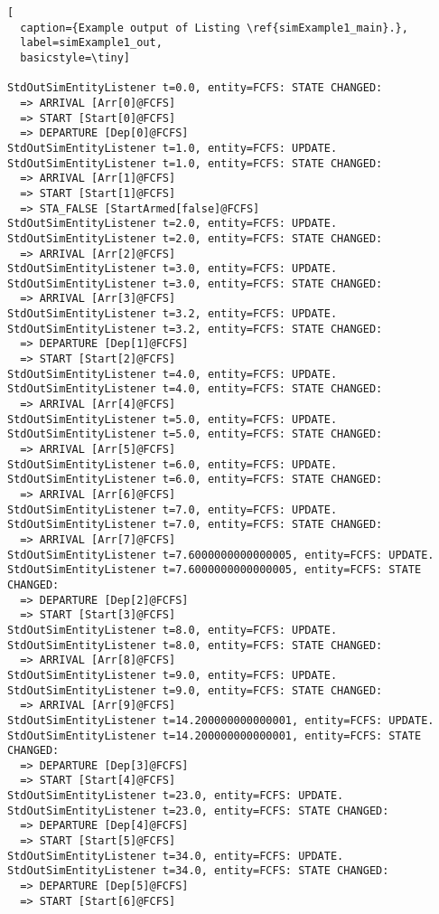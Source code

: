 \begin{lstfloat}
\begin{lstlisting}[
  caption={Example output of Listing \ref{simExample1_main}.},
  label=simExample1_out,
  basicstyle=\tiny]

StdOutSimEntityListener t=0.0, entity=FCFS: STATE CHANGED:
  => ARRIVAL [Arr[0]@FCFS]
  => START [Start[0]@FCFS]
  => DEPARTURE [Dep[0]@FCFS]
StdOutSimEntityListener t=1.0, entity=FCFS: UPDATE.
StdOutSimEntityListener t=1.0, entity=FCFS: STATE CHANGED:
  => ARRIVAL [Arr[1]@FCFS]
  => START [Start[1]@FCFS]
  => STA_FALSE [StartArmed[false]@FCFS]
StdOutSimEntityListener t=2.0, entity=FCFS: UPDATE.
StdOutSimEntityListener t=2.0, entity=FCFS: STATE CHANGED:
  => ARRIVAL [Arr[2]@FCFS]
StdOutSimEntityListener t=3.0, entity=FCFS: UPDATE.
StdOutSimEntityListener t=3.0, entity=FCFS: STATE CHANGED:
  => ARRIVAL [Arr[3]@FCFS]
StdOutSimEntityListener t=3.2, entity=FCFS: UPDATE.
StdOutSimEntityListener t=3.2, entity=FCFS: STATE CHANGED:
  => DEPARTURE [Dep[1]@FCFS]
  => START [Start[2]@FCFS]
StdOutSimEntityListener t=4.0, entity=FCFS: UPDATE.
StdOutSimEntityListener t=4.0, entity=FCFS: STATE CHANGED:
  => ARRIVAL [Arr[4]@FCFS]
StdOutSimEntityListener t=5.0, entity=FCFS: UPDATE.
StdOutSimEntityListener t=5.0, entity=FCFS: STATE CHANGED:
  => ARRIVAL [Arr[5]@FCFS]
StdOutSimEntityListener t=6.0, entity=FCFS: UPDATE.
StdOutSimEntityListener t=6.0, entity=FCFS: STATE CHANGED:
  => ARRIVAL [Arr[6]@FCFS]
StdOutSimEntityListener t=7.0, entity=FCFS: UPDATE.
StdOutSimEntityListener t=7.0, entity=FCFS: STATE CHANGED:
  => ARRIVAL [Arr[7]@FCFS]
StdOutSimEntityListener t=7.6000000000000005, entity=FCFS: UPDATE.
StdOutSimEntityListener t=7.6000000000000005, entity=FCFS: STATE CHANGED:
  => DEPARTURE [Dep[2]@FCFS]
  => START [Start[3]@FCFS]
StdOutSimEntityListener t=8.0, entity=FCFS: UPDATE.
StdOutSimEntityListener t=8.0, entity=FCFS: STATE CHANGED:
  => ARRIVAL [Arr[8]@FCFS]
StdOutSimEntityListener t=9.0, entity=FCFS: UPDATE.
StdOutSimEntityListener t=9.0, entity=FCFS: STATE CHANGED:
  => ARRIVAL [Arr[9]@FCFS]
StdOutSimEntityListener t=14.200000000000001, entity=FCFS: UPDATE.
StdOutSimEntityListener t=14.200000000000001, entity=FCFS: STATE CHANGED:
  => DEPARTURE [Dep[3]@FCFS]
  => START [Start[4]@FCFS]
StdOutSimEntityListener t=23.0, entity=FCFS: UPDATE.
StdOutSimEntityListener t=23.0, entity=FCFS: STATE CHANGED:
  => DEPARTURE [Dep[4]@FCFS]
  => START [Start[5]@FCFS]
StdOutSimEntityListener t=34.0, entity=FCFS: UPDATE.
StdOutSimEntityListener t=34.0, entity=FCFS: STATE CHANGED:
  => DEPARTURE [Dep[5]@FCFS]
  => START [Start[6]@FCFS]

\end{lstlisting}
\end{lstfloat}
